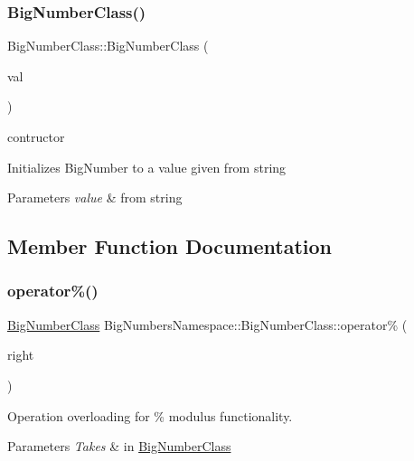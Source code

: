 \subsubsection{\texorpdfstring{Big\+Number\+Class()}{BigNumberClass()}\hspace{0.1cm}{\footnotesize\ttfamily [2/2]}}
{\footnotesize\ttfamily Big\+Number\+Class\+::\+Big\+Number\+Class (\begin{DoxyParamCaption}\item[{std\+::string}]{val }\end{DoxyParamCaption})}



contructor 

Initializes Big\+Number to a value given from string 
\begin{DoxyParams}{Parameters}
{\em value} & from string \\
\hline
\end{DoxyParams}


\subsection{Member Function Documentation}
\mbox{\label{class_big_numbers_namespace_1_1_big_number_class_a289b2ab10871c5d9cd074d86e7505723}} 
\subsubsection{\texorpdfstring{operator\%()}{operator\%()}}
{\footnotesize\ttfamily \mbox{\hyperlink{class_big_numbers_namespace_1_1_big_number_class}{Big\+Number\+Class}} Big\+Numbers\+Namespace\+::\+Big\+Number\+Class\+::operator\% (\begin{DoxyParamCaption}\item[{\mbox{\hyperlink{class_big_numbers_namespace_1_1_big_number_class}{Big\+Number\+Class}}}]{right }\end{DoxyParamCaption})}



Operation overloading for \% modulus functionality. 


\begin{DoxyParams}{Parameters}
{\em Takes} & in \mbox{\hyperlink{class_big_numbers_namespace_1_1_big_number_class}{Big\+Number\+Class}} \\
\hline
\end{DoxyParams}
\mbox{\label{class_big_numbers_namespace_1_1_big_number_class_a07bfcd8a84f38414dc8abc614107824f}} 
